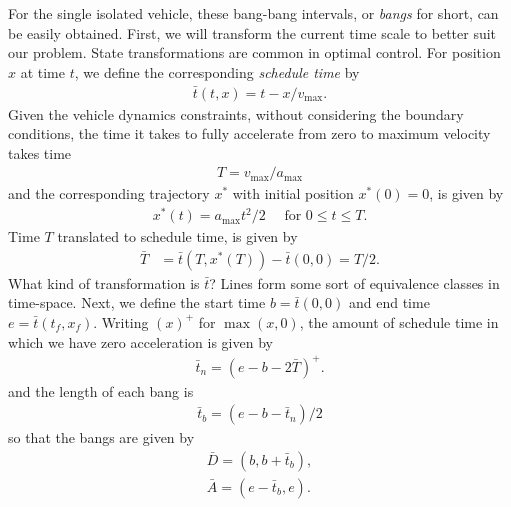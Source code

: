\documentclass[a4paper]{article}
\theoremstyle{definition}
\theoremstyle{plain}
\begin{document}
For the single isolated vehicle, these bang-bang intervals, or \textit{bangs}
for short, can be easily obtained.
%
First, we will transform the current time scale to better suit our problem.
{\color{blue} State transformations are common in optimal control.}
For position $x$ at time $t$, we define the corresponding \textit{schedule time} by
\begin{align*}
  \bar{t}(t, x) = t - x / v_{\max} .
\end{align*}
%
Given the vehicle dynamics constraints, without considering the boundary
conditions, the time it takes to fully accelerate from zero to maximum velocity
takes time
\begin{align*}
  T = v_{\max} / a_{\max}
\end{align*}
and the corresponding trajectory $x^{*}$ with initial position $x^{*}(0)=0$, is
given by
\begin{align*}
  x^{*}(t) = a_{\max} t^{2} / 2 \quad \text{ for }0 \leq t \leq T .
\end{align*}
Time $T$ translated to schedule time, is given by
\begin{align*}
  \bar{T} &= \bar{t}(T, x^{*}(T)) - \bar{t}(0, 0) = T / 2 .
\end{align*}
{\color{blue} What kind of transformation is $\bar{t}$? Lines form some sort of equivalence classes in time-space.}
%
Next, we define the start time $b = \bar{t}(0, 0)$ and end time $e = \bar{t}(t_{f}, x_{f})$.
%
Writing $(x)^{+}$ for $\max(x, 0)$, the amount of schedule time in which we have
zero acceleration is given by
\begin{align*}
  \bar{t}_{n} = (e - b - 2\bar{T})^{+} .
\end{align*}
and the length of each bang is
\begin{align*}
  \bar{t}_{b} = (e - b - \bar{t}_{n}) / 2
\end{align*}
so that the bangs are given by
\begin{align*}
  \bar{D} = (b, b + \bar{t}_{b}) , \\
  \bar{A} = (e - \bar{t}_{b}, e) .
\end{align*}
\end{document}
